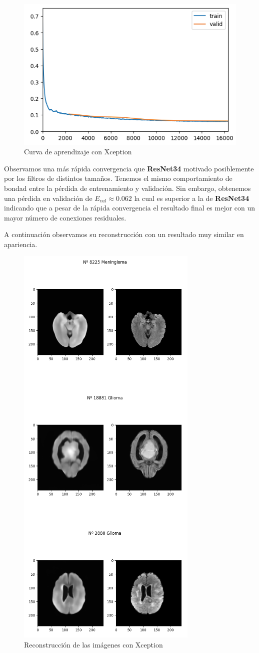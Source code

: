 \begin{figure}[H]
	\centering
	\includegraphics[width=0.7\linewidth]{imagenes/curva_xception.png}
	\caption{Curva de aprendizaje con Xception}
\end{figure}

Observamos una más rápida convergencia que \textbf{ResNet34} motivado posiblemente por los filtros de distintos tamaños. Tenemos el mismo comportamiento de bondad entre la pérdida de entrenamiento y validación. Sin embargo, obtenemos una pérdida en validación de $E_{val} \approx 0.062$ la cual es superior a la de \textbf{ResNet34} indicando que a pesar de la rápida convergencia el resultado final es mejor con un mayor número de conexiones residuales. 

A continuación observamos su reconstrucción con un resultado muy similar en apariencia.
\begin{figure}[H]
	\centering
	\includegraphics[width=0.4\linewidth]{imagenes/reconstruccion_xception.png}
	\caption{Reconstrucción de las imágenes con Xception}
\end{figure}

